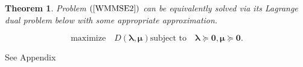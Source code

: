 \documentclass[9pt,journal]{IEEEtran}
\newcommand{\paren}[1]{\left({#1}\right)}
\newtheorem{theorem}{Theorem}
\theoremstyle{definition}
\begin{document}
\begin{theorem}\label{theorem: dual}
Problem $\paren{\ref{WMMSE2}}$ can be equivalently solved via its Lagrange dual problem below with some appropriate approximation. 
\par\noindent\small
\begin{equation}
\label{dualproblem}
\text{maximize} \quad D\paren{\boldsymbol{\lambda},\boldsymbol{\mu}}\text{subject to}\quad  \boldsymbol{\lambda}  \succeq \mathbf{0}, \boldsymbol{\mu} \succeq \mathbf{0}.    
\end{equation}

\end{theorem}
\begin{IEEEproof}
See Appendix
\end{IEEEproof}
\end{document}
